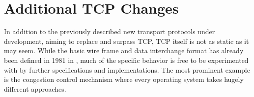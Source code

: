 \section{Additional TCP Changes}

In addition to the previously described new transport protocols under development, aiming to replace and surpass \gls{TCP}, \gls{TCP} itself is not as static as it may seem. While the basic wire frame and data interchange format has already been defined in 1981 in \cite{rfc793}, much of the specific behavior is free to be experimented with by further specifications and implementations. The most prominent example is the congestion control mechanism where every operating system takes hugely different approaches.


